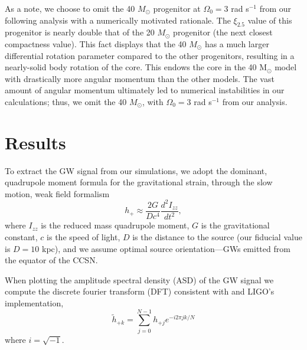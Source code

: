 \documentclass[twocolumn,times]{aastex62}  %
\newcommand{\Msun}{\ensuremath{\mathrm{M}_\odot}\xspace}
\begin{document}
As a note, we choose to omit the 40 $M_\odot$ progenitor at $\Omega_0 = 3$ rad s$^{-1}$ from our following analysis with a numerically motivated rationale.  The $\xi_{2.5}$ value of this progenitor is nearly double that of the 20 $M_\odot$ progenitor (the next closest compactness value).  This fact displays that the 40 $M_\odot$ has a much larger differential rotation parameter compared to the other progenitors, resulting in a nearly-solid body rotation of the core. This endows the core in the 40 \Msun model with drastically more angular momentum than the other models.  The vast amount of angular momentum ultimately led to numerical instabilities in our calculations; thus, we omit the 40 $M_\odot$, with $\Omega_0 = 3$ rad s$^{-1}$ from our analysis.  \\




%


\section{Results}
\label{sec:results}

To extract the GW signal from our simulations, we adopt the dominant, quadrupole moment formula for the gravitational strain, through the slow motion, weak field formalism %
\citep[eg.][]{finn:1990,blanchet:1990}
\begin{equation}
    h_+ \approx \frac{2G}{Dc^4}
    \frac{d^2I_{zz}}{dt^2},
\label{eq:quad}
\end{equation}
where $I_{zz}$ is the reduced mass quadrupole moment, $G$ is the gravitational constant, $c$ is the speed of light, $D$ is the distance to the source (our fiducial value is $D=10$ kpc), and we assume optimal source orientation---GWs emitted from the equator of the CCSN.\\
\par When plotting the amplitude spectral density (ASD) of the GW signal we compute the discrete fourier transform (DFT) consistent with \citet{anderson:2004} and LIGO's implementation,
\begin{equation}
\widetilde{h}_{+k} = \sum^{N-1}_{j=0} h_{+j} e^{-i2\pi jk/N}
\label{eq:dft}
\end{equation}
where $i=\sqrt{-1}$.
\end{document}
